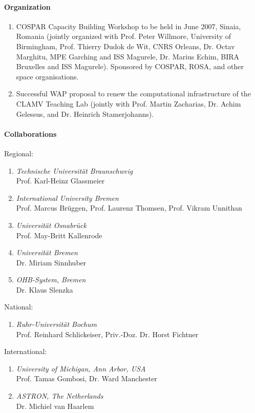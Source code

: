 \paragraph{Organization}

\begin{enumerate}
\item
COSPAR Capacity Building Workshop to be held in June 2007, Sinaia, Romania
(jointly organized with Prof. Peter Willmore, University of Birmingham,
Prof. Thierry Dudok de Wit, CNRS Orleans, Dr. Octav Marghitu, MPE Garching
and ISS Magurele, Dr. Marius Echim, BIRA Bruxelles and ISS Magurele).
Sponsored by COSPAR, ROSA, and other space organisations.
\item
Successful WAP proposal to renew the computational infrastructure of the
CLAMV Teaching Lab (jointly with Prof. Martin Zacharias, Dr. Achim Gelessus,
and Dr. Heinrich Stamerjohanns).
\end{enumerate}


\paragraph{Collaborations}\noindent

Regional:
\begin{enumerate}
\item
{\sl Technische Universit{\"a}t Braunschweig}\\
Prof. Karl-Heinz Glassmeier
\item
{\sl International University Bremen}\\ Prof. Marcus Br{\"u}ggen,
Prof. Laurenz Thomsen, Prof. Vikram Unnithan
\item
{\sl Universit{\"a}t Osnabr{\"u}ck}\\
Prof. May-Britt Kallenrode
\item
{\sl Universit{\"a}t Bremen}\\
Dr. Miriam Sinnhuber
\item
{\sl OHB-System, Bremen}\\ Dr. Klaus Slenzka
\end{enumerate}

National:
\begin{enumerate}
\item
{\sl Ruhr-Universit{\"a}t Bochum}\\
Prof. Reinhard Schlickeiser, Priv.-Doz. Dr. Horst Fichtner
\end{enumerate}

International:
\begin{enumerate}
\item
{\sl University of Michigan, Ann Arbor, USA}\\
Prof. Tamas Gombosi, Dr. Ward Manchester
\item
{\sl ASTRON, The Netherlands}\\ Dr. Michiel van Haarlem
\end{enumerate}


